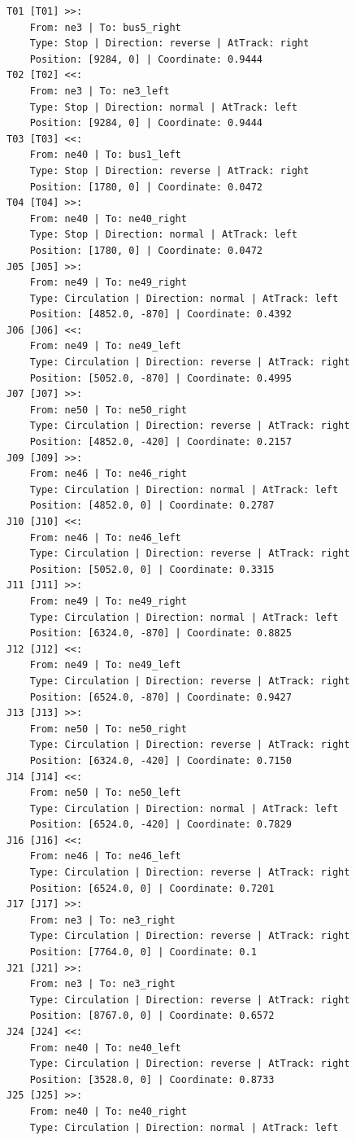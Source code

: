 	\begin{lstlisting}[language = {}, caption = Signalling.RNA, label = {lst:EJ9_6}]
T01 [T01] >>:
	From: ne3 | To: bus5_right
	Type: Stop | Direction: reverse | AtTrack: right 
	Position: [9284, 0] | Coordinate: 0.9444
T02 [T02] <<:
	From: ne3 | To: ne3_left
	Type: Stop | Direction: normal | AtTrack: left 
	Position: [9284, 0] | Coordinate: 0.9444
T03 [T03] <<:
	From: ne40 | To: bus1_left
	Type: Stop | Direction: reverse | AtTrack: right 
	Position: [1780, 0] | Coordinate: 0.0472
T04 [T04] >>:
	From: ne40 | To: ne40_right
	Type: Stop | Direction: normal | AtTrack: left 
	Position: [1780, 0] | Coordinate: 0.0472
J05 [J05] >>:
	From: ne49 | To: ne49_right
	Type: Circulation | Direction: normal | AtTrack: left 
	Position: [4852.0, -870] | Coordinate: 0.4392
J06 [J06] <<:
	From: ne49 | To: ne49_left
	Type: Circulation | Direction: reverse | AtTrack: right 
	Position: [5052.0, -870] | Coordinate: 0.4995
J07 [J07] >>:
	From: ne50 | To: ne50_right
	Type: Circulation | Direction: reverse | AtTrack: right 
	Position: [4852.0, -420] | Coordinate: 0.2157
J09 [J09] >>:
	From: ne46 | To: ne46_right
	Type: Circulation | Direction: normal | AtTrack: left 
	Position: [4852.0, 0] | Coordinate: 0.2787
J10 [J10] <<:
	From: ne46 | To: ne46_left
	Type: Circulation | Direction: reverse | AtTrack: right 
	Position: [5052.0, 0] | Coordinate: 0.3315
J11 [J11] >>:
	From: ne49 | To: ne49_right
	Type: Circulation | Direction: normal | AtTrack: left 
	Position: [6324.0, -870] | Coordinate: 0.8825
J12 [J12] <<:
	From: ne49 | To: ne49_left
	Type: Circulation | Direction: reverse | AtTrack: right 
	Position: [6524.0, -870] | Coordinate: 0.9427
J13 [J13] >>:
	From: ne50 | To: ne50_right
	Type: Circulation | Direction: reverse | AtTrack: right 
	Position: [6324.0, -420] | Coordinate: 0.7150
J14 [J14] <<:
	From: ne50 | To: ne50_left
	Type: Circulation | Direction: normal | AtTrack: left 
	Position: [6524.0, -420] | Coordinate: 0.7829
J16 [J16] <<:
	From: ne46 | To: ne46_left
	Type: Circulation | Direction: reverse | AtTrack: right 
	Position: [6524.0, 0] | Coordinate: 0.7201
J17 [J17] >>:
	From: ne3 | To: ne3_right
	Type: Circulation | Direction: reverse | AtTrack: right 
	Position: [7764.0, 0] | Coordinate: 0.1
J21 [J21] >>:
	From: ne3 | To: ne3_right
	Type: Circulation | Direction: reverse | AtTrack: right 
	Position: [8767.0, 0] | Coordinate: 0.6572
J24 [J24] <<:
	From: ne40 | To: ne40_left
	Type: Circulation | Direction: reverse | AtTrack: right 
	Position: [3528.0, 0] | Coordinate: 0.8733
J25 [J25] >>:
	From: ne40 | To: ne40_right
	Type: Circulation | Direction: normal | AtTrack: left 

\end{lstlisting}
